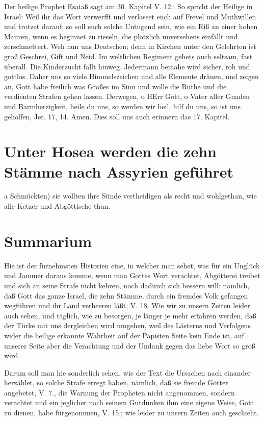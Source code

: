 Der heilige Prophet Esaiaß sagt am 30. Kapitel V. 12.: So spricht der Heilige in Israel: Weil ihr das Wort verwerfft und verlasset euch auf Frevel und Muthwillen und trotzet darauf; so soll euch solche Untugend sein, wie ein Riß an einer hohen Mauren, wenn es beginnet zu rieseln, die plötzlich unversehens einfällt und zerschmettert. Weh nun uns Deutschen; denn in Kirchen unter den Gelehrten ist groß Geschrei, Gift und Neid. Im weltlichen Regiment gehets auch seltsam, fast überall. Die Kinderzucht fällt hinweg. Jedermann beinahe wird sicher, roh und gottlos. Daher uns so viele Himmelszeichen und alle Elemente dräuen, und zeigen an, Gott habe freilich was Großes im Sinn und wolle die Ruthe und die verdienten Strafen gehen lassen. Derwegen, o HErr Gott, o Vater aller Gnaden und Barmherzigkeit, heile du uns, so werden wir heil, hilf du uns, so ist uns geholfen, Jer. 17, 14. Amen. Dies soll uns auch erinnern das 17. Kapitel.

\section[Unter Hosea werden die zehn Stämme nach Assyrien]{Unter Hosea werden die zehn Stämme nach Assyrien geführet}

a Schmückten) sie wollten ihre Sünde vertheidigen als recht und wohlgethan, wie alle Ketzer und Abgöttische thun.

\section{Summarium}

Hie ist der fürnehmsten Historien eine, in welcher man sehet, was für ein Unglück und Jammer daraus komme, wenn man Gottes Wort verachtet, Abgötterei treibet und sich an seine Strafe nicht kehren, noch dadurch sich bessern will: nämlich, daß Gott das ganze Israel, die zehn Stämme, durch ein fremdes Volk gefangen wegführen und ihr Land verheeren läßt, V. 18. Wie wir zu unsern Zeiten leider auch sehen, und täglich, wie zu besorgen, je länger je mehr erfahren werden, daß der Türke mit uns dergleichen wird umgehen, weil des Lästerns und Verfolgens wider die heilige erkannte Wahrheit auf der Papisten Seite kein Ende ist, auf unserer Seite aber die Verachtung und der Undank gegen das liebe Wort so groß wird.

Darum soll man hie sonderlich sehen, wie der Text die Ursachen nach einander herzählet, so solche Strafe erregt haben, nämlich, daß sie fremde Götter angebetet, V. 7., die Warnung der Propheten nicht angenommen, sondern verachtet und ein jeglicher nach seinem Gutdünken ihm eine eigene Weise, Gott zu dienen, habe fürgenommen, V. 15.; wie leider zu unsern Zeiten auch geschieht.



